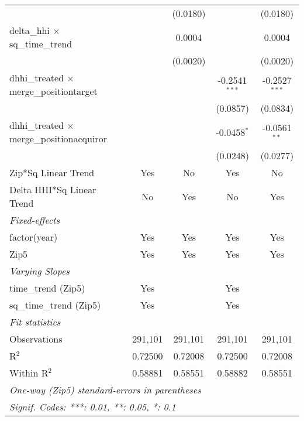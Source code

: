 \begin{table}[H]
{\begin{tabular}{lcccc}
   &   & (0.0180) &    & (0.0180)\\ 

 delta\_hhi $\times $ sq\_time\_trend&   & 0.0004 &    & 0.0004\\ 

   &   & (0.0020) &    & (0.0020)\\ 

 dhhi\_treated $\times $ merge\_positiontarget&   &    & -0.2541$^{***}$ & -0.2527$^{***}$\\ 

   &   &    & (0.0857) & (0.0834)\\ 

 dhhi\_treated $\times $ merge\_positionacquiror&   &    & -0.0458$^{*}$ & -0.0561$^{**}$\\ 

   &   &    & (0.0248) & (0.0277)\\ 

 Zip*Sq Linear Trend & Yes & No & Yes & No\\ 

 Delta HHI*Sq Linear Trend & No & Yes & No & Yes\\ 

 \midrule \emph{Fixed-effects}&   &   &   &  \\ 

 factor(year) & Yes & Yes & Yes & Yes\\ 

 Zip5 & Yes & Yes & Yes & Yes\\ 

 \midrule \emph{Varying Slopes}&   &   &   &  \\ 

 time\_trend (Zip5) & Yes &  & Yes & \\ 

 sq\_time\_trend (Zip5) & Yes &  & Yes & \\ 

 \midrule \emph{Fit statistics}&  & & & \\ 

 Observations & 291,101&291,101&291,101&291,101\\ 

 R$^2$ & 0.72500&0.72008&0.72500&0.72008\\ 

 Within R$^2$ & 0.58881&0.58551&0.58882&0.58551\\ 

 \midrule\midrule\multicolumn{5}{l}{\emph{One-way (Zip5) standard-errors in parentheses}}\\ 

 \multicolumn{5}{l}{\emph{Signif. Codes: ***: 0.01, **: 0.05, *: 0.1}}\\ 

 \end{tabular}} 

 \end{table} 

